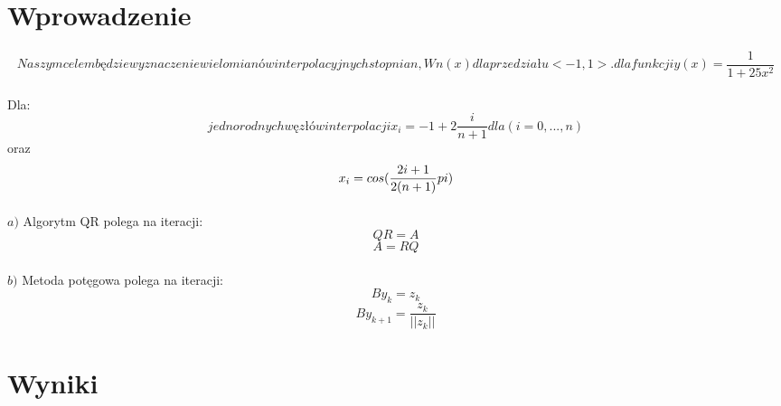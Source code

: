 \documentclass{article}
\begin{document}
\author{Bartłomiej Kachnic}
\section{Wprowadzenie}

\paragraph{}
\begin{equation}
Naszym celem będzie wyznaczenie wielomianów interpolacyjnych stopnia n, Wn(x) dla przedziału <-1, 1>.
dla funkcji  y(x) = \frac{1}{1 + 25x^2} \end{equation}

\paragraph{}
Dla: \\
\begin{equation*}
jednorodnych węzłów interpolacji x_i = -1 + 2\frac{i}{n+1} dla (i=0, ... , n)
\end{equation*}
oraz
\begin{equation*}
x_i = cos(\frac{2i+1}{2(n+1)}pi)$$

\end{equation*}
\paragraph{}
$a)$ Algorytm QR polega na iteracji: \\
\begin{equation*}
    QR = A 
\end{equation*}
\begin{equation*}
    A = RQ
\end{equation*}
\paragraph{}
$b)$ Metoda potęgowa polega na iteracji: \\
\begin{equation*}
    By_{k} = z_{k}
\end{equation*}
\begin{equation*}
    By_{k+1} = \frac{z_{k}}{||z_{k}||}
\end{equation*}
\medskip
\section{Wyniki}
\end{document}
